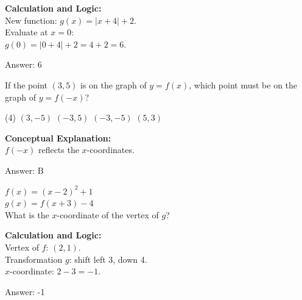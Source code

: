 \documentclass[11pt,paper=a4,answers]{exam}
\begin{document}
\begin{questions}
\begin{solution}
\textbf{Calculation and Logic:} \\
New function: $g(x) = |x + 4| + 2$. \\
Evaluate at $x = 0$: \\
$g(0) = |0 + 4| + 2 = 4 + 2 = 6$.

\vspace{25pt}

Answer: \colorbox{yellow!100}{6}
\end{solution}

\vspace{40pt}

\question

If the point $(3, 5)$ is on the graph of $y = f(x)$, which point must be on the graph of $y = f(-x)$?
\begin{tasks}(4)
    \task $(3, -5)$
    \task $(-3, 5)$
    \task $(-3, -5)$
    \task $(5, 3)$
\end{tasks}

\begin{solution}
\textbf{Conceptual Explanation:} \\
$f(-x)$ reflects the $x$-coordinates.

\vspace{25pt}

Answer: \colorbox{yellow!100}{B}
\end{solution}

\vspace{40pt}

\question
$f(x) = (x-2)^2 + 1$ \\
$g(x) = f(x+3) - 4$ \\
What is the $x$-coordinate of the vertex of $g$?

\begin{solution}
\textbf{Calculation and Logic:} \\
Vertex of $f$: $(2, 1)$. \\
Transformation $g$: shift left 3, down 4. \\
$x$-coordinate: $2 - 3 = -1$.

\vspace{25pt}

Answer: \colorbox{yellow!100}{-1}
\end{solution}

\vspace{40pt}


\end{questions}
\end{document}
